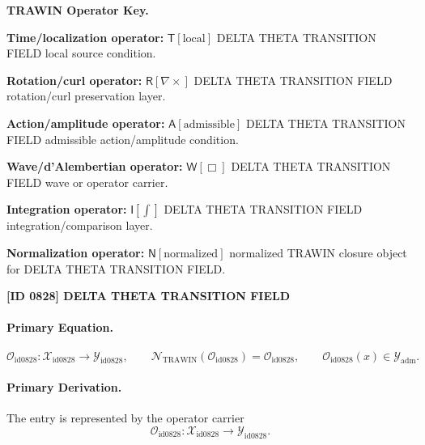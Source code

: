 \par\vspace{0.45\baselineskip}
\noindent\begin{minipage}[t]{\linewidth}
\begingroup
\small
\raggedright
\textbf{TRAWIN Operator Key.}\par
\noindent\textbf{Time/localization operator:} $\mathsf{T}\!\left[\mathrm{local}\right]$ DELTA THETA TRANSITION FIELD local source condition.\par
\noindent\textbf{Rotation/curl operator:} $\mathsf{R}\!\left[\nabla\times\right]$ DELTA THETA TRANSITION FIELD rotation/curl preservation layer.\par
\noindent\textbf{Action/amplitude operator:} $\mathsf{A}\!\left[\mathrm{admissible}\right]$ DELTA THETA TRANSITION FIELD admissible action/amplitude condition.\par
\noindent\textbf{Wave/d'Alembertian operator:} $\mathsf{W}\!\left[\Box\right]$ DELTA THETA TRANSITION FIELD wave or operator carrier.\par
\noindent\textbf{Integration operator:} $\mathsf{I}\!\left[\int\right]$ DELTA THETA TRANSITION FIELD integration/comparison layer.\par
\noindent\textbf{Normalization operator:} $\mathsf{N}\!\left[\mathrm{normalized}\right]$ normalized TRAWIN closure object for DELTA THETA TRANSITION FIELD.\par
\endgroup
\end{minipage}

\clearpage
\noindent\textbf{[ID 0828] DELTA THETA TRANSITION FIELD}\par
\vspace{0.35em}
\paragraph{Primary Equation.}
\[
\mathcal{O}_{\mathrm{id0828}}:\mathcal{X}_{\mathrm{id0828}}\longrightarrow \mathcal{Y}_{\mathrm{id0828}},\qquad
\mathcal{N}_{\mathrm{TRAWIN}}(\mathcal{O}_{\mathrm{id0828}})=\mathcal{O}_{\mathrm{id0828}},\qquad
\mathcal{O}_{\mathrm{id0828}}(x)\in\mathcal{Y}_{\mathrm{adm}}.
\]

\paragraph{Primary Derivation.} The entry is represented by the operator carrier\[
\mathcal{O}_{\mathrm{id0828}}:\mathcal{X}_{\mathrm{id0828}}\longrightarrow \mathcal{Y}_{\mathrm{id0828}}.
\]

